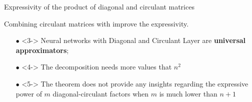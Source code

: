 \begin{frame}{Expressivity of the product of diagonal and circulant matrices}

  \begin{minipage}{\textwidth}
    \centering
    Combining circulant matrices with  improve the expressivity.
  \end{minipage}
  \vspace{0.05cm}


  {\small
  \begin{itemize}[parsep=0pt,leftmargin=15pt]
    \nointerlineskip
    \item[$\bullet$] <3-> Neural networks with Diagonal and Circulant Layer are \textbf{universal approximators}; 
  \end{itemize}

  \begin{itemize}[parsep=0pt,leftmargin=15pt]
    \nointerlineskip
    \item[$\bullet$] <4-> The decomposition needs more values that $n^2$
    \item[$\bullet$] <5-> The theorem does not provide any insights regarding the expressive power of $m$ diagonal-circulant factors when $m$ is much lower than $n + 1$
  \end{itemize}
  }




\end{frame}


